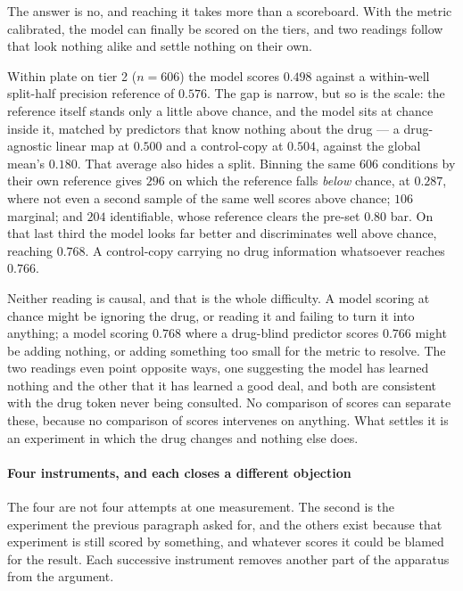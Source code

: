 \noindent
The answer is no, and reaching it takes more than a scoreboard. With the metric
calibrated, the model can finally be scored on the tiers, and two readings follow
that look nothing alike and settle nothing on their own.

Within plate on tier 2 ($n = \num{606}$) the model scores $0.498$ against a
within-well split-half precision reference of $0.576$. The gap is narrow, but so is the scale: the
reference itself stands only a little above chance, and the model sits at chance
inside it, matched by predictors that know nothing about the drug --- a
drug-agnostic linear map at $0.500$ and a control-copy at $0.504$, against the
global mean's $0.180$. That average also hides a split. Binning the same $\num{606}$
conditions by their own reference gives $296$ on which the reference falls
\emph{below} chance, at $0.287$, where not even a second sample of the same well
scores above chance; $106$ marginal; and $204$ identifiable, whose reference
clears the pre-set $0.80$ bar. On that last third the model looks far better and
discriminates well above chance, reaching $0.768$. A control-copy carrying no
drug information whatsoever reaches $0.766$.

Neither reading is causal, and that is the whole difficulty. A model scoring at
chance might be ignoring the drug, or reading it and failing to turn it into
anything; a model scoring $0.768$ where a drug-blind predictor scores $0.766$
might be adding nothing, or adding something too small for the metric to resolve.
The two readings even point opposite ways, one suggesting the model has learned
nothing and the other that it has learned a good deal, and both are consistent
with the drug token never being consulted. No comparison of scores can separate
these, because no comparison of scores intervenes on anything. What settles it is
an experiment in which the drug changes and nothing else does.

\paragraph{Four instruments, and each closes a different objection} The four are
not four attempts at one measurement. The second is the experiment the previous
paragraph asked for, and the others exist because that experiment is still scored
by something, and whatever scores it could be blamed for the result. Each
successive instrument removes another part of the apparatus from the argument.

